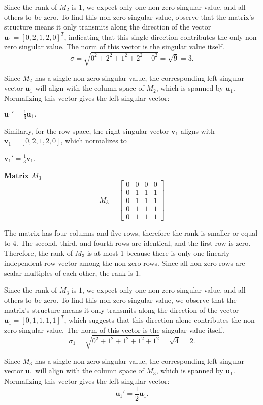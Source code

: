 \documentclass[a4paper,oneside,bibliography=totoc]{scrartcl}
\begin{document}
Since the rank of $M_2$ is $1$, we expect only one non-zero singular value, and all others to be zero. To find this non-zero singular value, observe that the matrix’s structure means it only transmits along the direction of the vector $\mathbf{u}_1 = [0, 2, 1, 2, 0]^T$, indicating that this single direction contributes the only non-zero singular value. The norm of this vector is the singular value itself.
\[
\sigma = \sqrt{0^2 + 2^2 + 1^2 + 2^2 + 0^2} = \sqrt{9} = 3.
\]

Since $M_2$ has a single non-zero singular value, the corresponding left singular vector $\mathbf{u}_1$ will align with the column space of $M_2$, which is spanned by  $\mathbf{u}_1$. Normalizing this vector gives the left singular vector:

$\mathbf{u}_1{\prime} = \frac{1}{3} \mathbf{u}_1.$

Similarly, for the row space, the right singular vector $\mathbf{v}_1$ aligns with $\mathbf{v}_1 = [0, 2, 1, 2, 0]$, which normalizes to

$\mathbf{v}_1{\prime} = \frac{1}{3} \mathbf{v}_1$.

\textbf{Matrix \( M_3 \)}
\[
M_3 = \begin{bmatrix} 0 & 0 & 0 & 0 \\ 0 & 1 & 1 & 1 \\ 0 & 1 & 1 & 1 \\ 0 & 1 & 1 & 1 \\ 0 & 1 & 1 & 1 \end{bmatrix}
\]

The matrix has four columns and five rows, therefore the rank is smaller or equal to 4. The second, third, and fourth rows are identical, and the first row is zero. Therefore, the rank of $M_3$ is at most 1 because there is only one linearly independent row vector among the non-zero rows. Since all non-zero rows are scalar multiples of each other, the rank is 1.

Since the rank of $M_3$ is $1$, we expect only one non-zero singular value, and all others to be zero. To find this non-zero singular value, we observe that the matrix’s structure means it only transmits along the direction of the vector $\mathbf{u}_1 = [0, 1, 1, 1, 1]^T$, which suggests that this direction alone contributes the non-zero singular value. The norm of this vector is the singular value itself.
\[
\sigma_1 = \sqrt{0^2 + 1^2 + 1^2 + 1^2 + 1^2} = \sqrt{4} = 2.
\]

Since $M_3$ has a single non-zero singular value, the corresponding left singular vector $\mathbf{u}_1$ will align with the column space of $M_3$, which is spanned by  $\mathbf{u}_1$. Normalizing this vector gives the left singular vector:
\[
\mathbf{u}_1{\prime} = \frac{1}{2} \mathbf{u}_1.
\]
\end{document}

